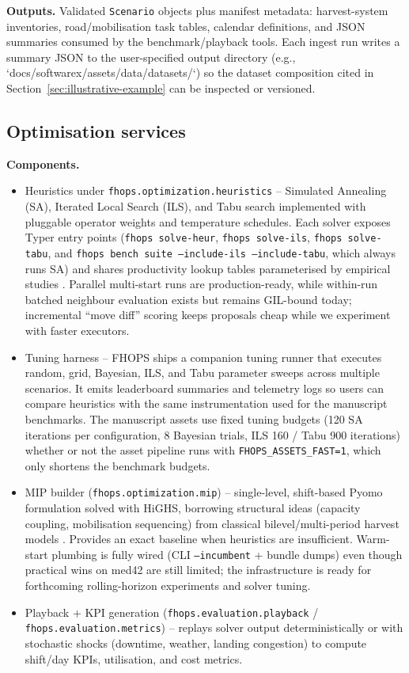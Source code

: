 \textbf{Outputs.} Validated \texttt{Scenario} objects plus manifest metadata: harvest-system inventories, road/mobilisation task tables, calendar definitions, and JSON summaries consumed by the benchmark/playback tools. Each ingest run writes a summary JSON to the user-specified output directory (e.g., `docs/softwarex/assets/data/datasets/`) so the dataset composition cited in Section~\ref{sec:illustrative-example} can be inspected or versioned.

\subsection{Optimisation services}
\textbf{Components.}
\begin{itemize}
  \item Heuristics under \texttt{fhops.optimization.heuristics} – Simulated Annealing (SA), Iterated Local Search (ILS), and Tabu search implemented with pluggable operator weights and temperature schedules. Each solver exposes Typer entry points (\texttt{fhops solve-heur}, \texttt{fhops solve-ils}, \texttt{fhops solve-tabu}, and \texttt{fhops bench suite --include-ils --include-tabu}, which always runs SA) and shares productivity lookup tables parameterised by empirical studies \cite{lahrsen2022productivity,becker2018lidar}. Parallel multi-start runs are production-ready, while within-run batched neighbour evaluation exists but remains GIL-bound today; incremental “move diff” scoring keeps proposals cheap while we experiment with faster executors.
  \item Tuning harness – FHOPS ships a companion tuning runner that executes random, grid, Bayesian, ILS, and Tabu parameter sweeps across multiple scenarios. It emits leaderboard summaries and telemetry logs so users can compare heuristics with the same instrumentation used for the manuscript benchmarks. The manuscript assets use fixed tuning budgets (120 SA iterations per configuration, 8 Bayesian trials, ILS 160 / Tabu 900 iterations) whether or not the asset pipeline runs with \texttt{FHOPS\_ASSETS\_FAST=1}, which only shortens the benchmark budgets.
  \item MIP builder (\texttt{fhops.optimization.mip}) – single-level, shift-based Pyomo formulation solved with HiGHS, borrowing structural ideas (capacity coupling, mobilisation sequencing) from classical bilevel/multi-period harvest models \cite{paradis2018bilevel,nelson2003forestmodels}. Provides an exact baseline when heuristics are insufficient. Warm-start plumbing is fully wired (CLI \texttt{--incumbent} + bundle dumps) even though practical wins on med42 are still limited; the infrastructure is ready for forthcoming rolling-horizon experiments and solver tuning.
  \item Playback + KPI generation (\texttt{fhops.evaluation.playback} / \texttt{fhops.evaluation.metrics}) – replays solver output deterministically or with stochastic shocks (downtime, weather, landing congestion) to compute shift/day KPIs, utilisation, and cost metrics.
\end{itemize}

